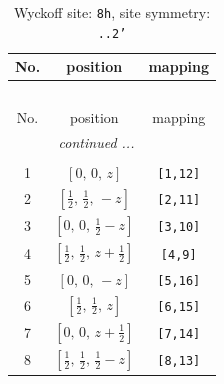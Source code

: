 \documentclass[fleqn,8pt]{jsarticle}
\begin{document}
\begin{longtable}{ccc}
\caption{Wyckoff site: {\tt 8h}, site symmetry: {\tt ..2'}}
 \\
 \hline \hline
No. & position & mapping \\ \hline \endfirsthead

\multicolumn{2}{l}{\tablename\ \thetable{}} \\
 \hline \hline
No. & position & mapping \\ \hline \endhead

 \hline \hline
\multicolumn{2}{r}{\footnotesize\it continued ...} \\ \endfoot

 \hline \hline
\multicolumn{2}{r}{} \\ \endlastfoot

1 & $\left[ 0,\, 0,\, z \right]$ & {\tt [1,12]} \\ \hline
2 & $\left[ \frac{1}{2},\, \frac{1}{2},\, - z \right]$ & {\tt [2,11]} \\ \hline
3 & $\left[ 0,\, 0,\, \frac{1}{2} - z \right]$ & {\tt [3,10]} \\ \hline
4 & $\left[ \frac{1}{2},\, \frac{1}{2},\, z + \frac{1}{2} \right]$ & {\tt [4,9]} \\ \hline
5 & $\left[ 0,\, 0,\, - z \right]$ & {\tt [5,16]} \\ \hline
6 & $\left[ \frac{1}{2},\, \frac{1}{2},\, z \right]$ & {\tt [6,15]} \\ \hline
7 & $\left[ 0,\, 0,\, z + \frac{1}{2} \right]$ & {\tt [7,14]} \\ \hline
8 & $\left[ \frac{1}{2},\, \frac{1}{2},\, \frac{1}{2} - z \right]$ & {\tt [8,13]} \\
\end{longtable}
\renewcommand{\arraystretch}{1.2}
\end{document}
